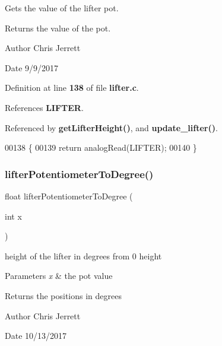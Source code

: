 Gets the value of the lifter pot. 

\begin{DoxyReturn}{Returns}
the value of the pot. 
\end{DoxyReturn}
\begin{DoxyAuthor}{Author}
Chris Jerrett 
\end{DoxyAuthor}
\begin{DoxyDate}{Date}
9/9/2017 
\end{DoxyDate}


Definition at line \textbf{ 138} of file \textbf{ lifter.\+c}.



References \textbf{ L\+I\+F\+T\+ER}.



Referenced by \textbf{ get\+Lifter\+Height()}, and \textbf{ update\+\_\+lifter()}.


\begin{DoxyCode}
00138                      \{
00139   \textcolor{keywordflow}{return} analogRead(LIFTER);
00140 \}
\end{DoxyCode}
\mbox{\label{lifter_8c_ab0460888f3213e5510bd25ae1e152a75}} 
\subsubsection{lifter\+Potentiometer\+To\+Degree()}
{\footnotesize\ttfamily float lifter\+Potentiometer\+To\+Degree (\begin{DoxyParamCaption}\item[{int}]{x }\end{DoxyParamCaption})}



height of the lifter in degrees from 0 height 


\begin{DoxyParams}{Parameters}
{\em x} & the pot value \\
\hline
\end{DoxyParams}
\begin{DoxyReturn}{Returns}
the positions in degrees 
\end{DoxyReturn}
\begin{DoxyAuthor}{Author}
Chris Jerrett 
\end{DoxyAuthor}
\begin{DoxyDate}{Date}
10/13/2017 
\end{DoxyDate}


